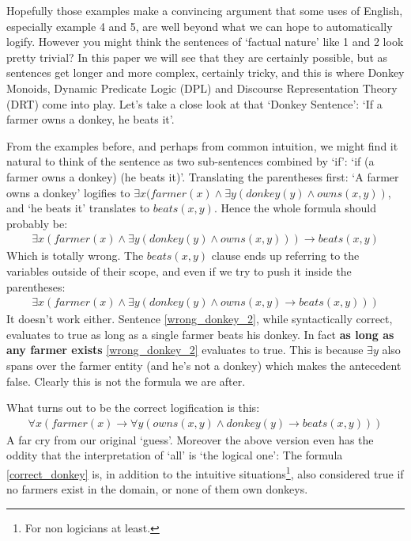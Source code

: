 \documentclass[12pt]{article}
\begin{document}
Hopefully those examples make a convincing argument that some uses of English, especially example 4 and 5, are well beyond what we can hope to automatically logify. However you might think the sentences of `factual nature' like 1 and 2 look pretty trivial? In this paper we will see that they are certainly possible, but as sentences get longer and more complex, certainly tricky, and this is where Donkey Monoids, Dynamic Predicate Logic (DPL) and Discourse Representation Theory (DRT) come into play. Let's take a close look at that `Donkey Sentence': `If a farmer owns a donkey, he beats it'.

From the examples before, and perhaps from common intuition, we might find it natural to think of the sentence as two sub-sentences combined by `if': `if (a farmer owns a donkey) (he beats it)'. Translating the parentheses first: `A farmer owns a donkey' logifies to $\exists x (farmer(x) \wedge \exists y (donkey(y)\wedge owns(x,y))$, and `he beats it' translates to $beats(x,y)$. Hence the whole formula should probably be:
%
\begin{align}
\exists x (farmer(x) \wedge \exists y (donkey(y)\wedge owns(x,y))) \rightarrow beats(x,y)
\end{align}
%
Which is totally wrong. The $beats(x,y)$ clause ends up referring to the variables outside of their scope, and even if we try to push it inside the parentheses:
%
\begin{align}
\exists x (farmer(x) \wedge \exists y (donkey(y)\wedge owns(x,y) \rightarrow beats(x,y))) \label{wrong_donkey_2}
\end{align}
%
It doesn't work either. Sentence \eqref{wrong_donkey_2}, while syntactically correct, evaluates to true as long as a single farmer beats his donkey. In fact \textbf{as long as any farmer exists} \eqref{wrong_donkey_2} evaluates to true. This is because $\exists y$ also spans over the farmer entity (and he's not a donkey) which makes the antecedent false. Clearly this is not the formula we are after.

What turns out to be the correct logification is this:
%
\begin{align}
\forall x (farmer(x) \rightarrow \forall y (owns(x,y) \wedge donkey(y) \rightarrow beats(x,y))) \label{correct_donkey}
\end{align}
%
A far cry from our original `guess'. Moreover the above version even has the oddity that the interpretation of `all' is `the logical one': The formula \eqref{correct_donkey} is, in addition to the intuitive situations\footnote{For non logicians at least.}, also considered true if no farmers exist in the domain, or none of them own donkeys.
\end{document}
